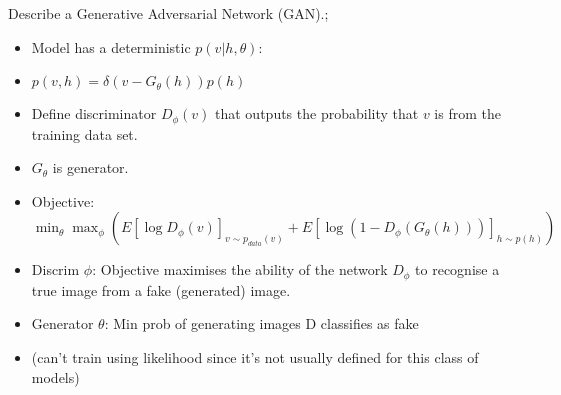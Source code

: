 \documentclass{article}
\begin{document}
Describe a Generative Adversarial Network (GAN).; \begin{itemize}
    \item Model has a deterministic $p(v|h, \theta)$: \item $p(v, h) = \delta(v-G_\theta(h))p(h)$
    \item Define discriminator $D_\phi(v)$ that outputs the probability that $v$ is from the training data set.
    \item $G_\theta$ is generator.
    \item Objective: $\min_\theta \max_\phi (E[\log D_\phi(v)]_{v\sim p_{data}(v)} + E[\log(1-D_{\phi}(G_\theta(h)))]_{h\sim p(h)})$ 
    \item Discrim $\phi$: Objective maximises the ability of the network $D_\phi$ to recognise a true image from a fake (generated) image.
    \item Generator $\theta$: Min prob of generating images D classifies as fake
    \item (can't train using likelihood since it's not usually defined for this class of models)
\end{itemize}
\end{document}
